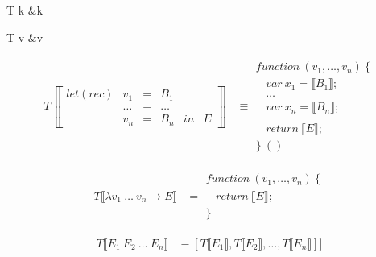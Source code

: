\begin{haskell}
T \llbracket k \rrbracket &\equiv k
\end{haskell}

\begin{haskell}
T \llbracket v \rrbracket &\equiv v
\end{haskell}

\begin{align*}
T \left \llbracket \begin{array}{cccccc}
let(rec) & v_1    & = & B_1    &    & \\
         & \ldots & = & \ldots &    & \\
         & v_n    & = & B_n    & in & E
\end{array} \right \rrbracket &\equiv \begin{array}{l}
function\ (v_1, \ldots, v_n)\ \{ \\
\ \ \ \ var\ x_1 = \llbracket B_1 \rrbracket; \\
\ \ \ \ \ldots \\
\ \ \ \ var\ x_n = \llbracket B_n \rrbracket; \\
\\
\ \ \ \ return\ \llbracket E \rrbracket; \\
\}\ ()
\end{array}
\end{align*}

\begin{align*}
T\llbracket \lambda v_1 \: \ldots \: v_n \rightarrow E \rrbracket &= \begin{array}{l}
function\ (v_1, \ldots, v_n)\ \{ \\
\ \ \ \ return\ \llbracket E \rrbracket; \\
\}
\end{array}
\end{align*}

\begin{align*}
T \llbracket E_1 \: E_2 \: \ldots \: E_n \rrbracket &
    \equiv [T \llbracket E_1 \rrbracket, T \llbracket E_2 \rrbracket, \ldots, T \llbracket E_n \rrbracket]]
\end{align*}

